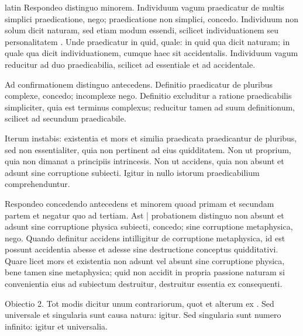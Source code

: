 \begin{otherlanguage*}{latin}
\pstart
  Respondeo distinguo minorem. Individuum vagum praedicatur de multis simplici praedicatione, nego; praedicatione non simplici, concedo. Individuum non solum dicit naturam, sed etiam modum essendi, scilicet individuationem seu personalitatem . Unde praedicatur in quid, quale: in quid qua dicit naturam; in quale qua dicit individuationem, cumque haec sit accidentalis. Individuum vagum reducitur ad duo praedicabilia, scilicet ad essentiale et ad accidentale. 
\pend

\pstart
  Ad confirmationem distinguo antecedens. Definitio praedicatur de pluribus complexe, concedo; incomplexe nego. Definitio excluditur a ratione praedicabilis simpliciter, quia est terminus complexus; reducitur tamen ad suum definitionum, scilicet ad secundum praedicabile. 
\pend

\pstart
  Iterum instabis: existentia et mors et similia praedicata praedicantur de pluribus, sed non essentialiter, quia non pertinent ad eius quidditatem. Non ut proprium, quia non dimanat a principiis intrincesis. Non ut accidens, quia non absunt et adsunt sine corruptione subiecti. Igitur in nullo istorum praedicabilium comprehenduntur. 
\pend

\pstart
  Respondeo concedendo antecedens et minorem quoad primam et secundam partem et negatur quo ad tertiam. Ast \textnormal{|} probationem distinguo non absunt et adsunt sine corruptione physica subiecti, concedo; sine corruptione metaphysica, nego. Quando definitur accidens intilligitur de corruptione metaphysica, id est possunt accidentia abesse et adesse sine destructione conceptus quidditativi. Quare licet mors et existentia non adsunt vel absunt sine corruptione physica, bene tamen sine metaphysica; quid non accidit in propria passione naturam si convenientia eius ad subiectum destruitur, destruitur essentia ex consequenti. 
\pend

\pstart
  Obiectio 2. Tot modis dicitur unum contrariorum, quot et alterum ex . Sed universale et singularia sunt causa natura: igitur. Sed singularia sunt numero infinito: igitur et universalia. 
\pend


\end{otherlanguage*}
